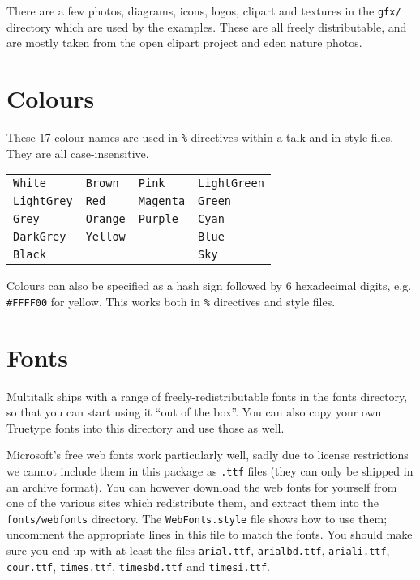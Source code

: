 \documentclass[12pt,a4paper,twoside]{article}
\renewcommand{\_}{\texttt{\symbol{95}}}
\begin{document}
There are a few photos, diagrams, icons, logos, clipart and textures in the
\verb=gfx/= directory which are used by the examples. These are all freely
distributable, and are mostly taken from the open clipart project and eden
nature photos.

\section{Colours}

These 17 colour names are used in \verb^%^ directives within a talk and in
style files. They are all case-insensitive.

\begin{tabular}{llll}
\verb^White^       & \verb^Brown^    & \verb^Pink^      & \verb^LightGreen^\\
\verb^LightGrey^   & \verb^Red^      & \verb^Magenta^   & \verb^Green^\\
\verb^Grey^        & \verb^Orange^   & \verb^Purple^    & \verb^Cyan^\\
\verb^DarkGrey^    & \verb^Yellow^   &                  & \verb^Blue^\\
\verb^Black^       &                 &                  & \verb^Sky^\\
\end{tabular}

Colours can also be specified as a hash sign followed by 6
hexadecimal digits, e.g. \verb^#FFFF00^ for yellow. This works
both in \verb^%^ directives and style files.

\section{Fonts}

Multitalk ships with a range of freely-redistributable fonts in the fonts
directory, so that you can start using it ``out of the box''. You can also copy
your own Truetype fonts into this directory and use those as well.

Microsoft's free web fonts work particularly well, sadly due to license
restrictions we cannot include them in this package as \verb=.ttf= files
(they can
only be shipped in an archive format). You can however download the web fonts
for yourself from one of the various sites which redistribute them, and extract
them into the \verb=fonts/webfonts= directory.
The \verb=WebFonts.style= file shows how to
use them; uncomment the appropriate lines in this file to match the fonts. You
should make sure you end up with at least the files \verb=arial.ttf=,
\verb=arialbd.ttf=, \verb=ariali.ttf=, \verb=cour.ttf=, \verb=times.ttf=,
\verb=timesbd.ttf= and \verb=timesi.ttf=.
\end{document}
